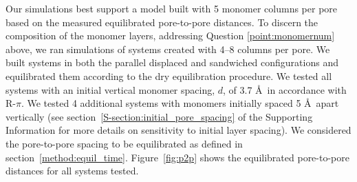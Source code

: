 \documentclass[journal=jpcbfk,manuscript=article]{achemso}
\begin{document}
%  
  
  Our simulations best support a model built with 5 monomer columns per pore based on
  the measured equilibrated pore-to-pore distances. To discern the composition of
  the monomer layers, addressing Question \ref{point:monomernum} above, we ran
  simulations of systems created with 4--8 columns per pore. We built systems in both
  the parallel displaced and sandwiched configurations and equilibrated them according
  to the dry equilibration procedure. We tested all systems with an initial vertical monomer 
  spacing, $\mathit{d}$, of 3.7 \AA~in accordance with R-$\pi$. We tested 4 additional 
  systems with monomers initially spaced 5 \AA~apart vertically (see section~\ref{S-section:initial_pore_spacing}
  of the Supporting Information for more details on sensitivity to initial layer spacing). 
  We considered the pore-to-pore spacing to be equilibrated as defined in section~\ref{method:equil_time}.
  Figure~\ref{fig:p2p} shows the equilibrated pore-to-pore distances for all systems tested. 
  
\end{document}
